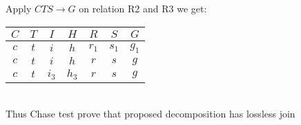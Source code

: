 Apply $CTS \rightarrow G$ on relation R2 and R3 we get:\\

\begin{tabular}{ c | c | c | c | c | c | c }
  $C$ & $T$ & $I$ & $H$ & $R$ & $S$ & $G$ \\ 
  \hline\hline
  $c$ & $t$ & $i$ & $h$ & $r_1$ & $s_1$ & $g_1$\\
  \hline 
  $c$ & $t$ & $i$ & $h$ & $r$ & $s$ & $g$\\
  \hline 
  $c$ & $t$ & $i_3$ & $h_3$ & $r$ & $s$ & $g$\\
\end{tabular} \\


Thus Chase test  prove that proposed decomposition has lossless join\\